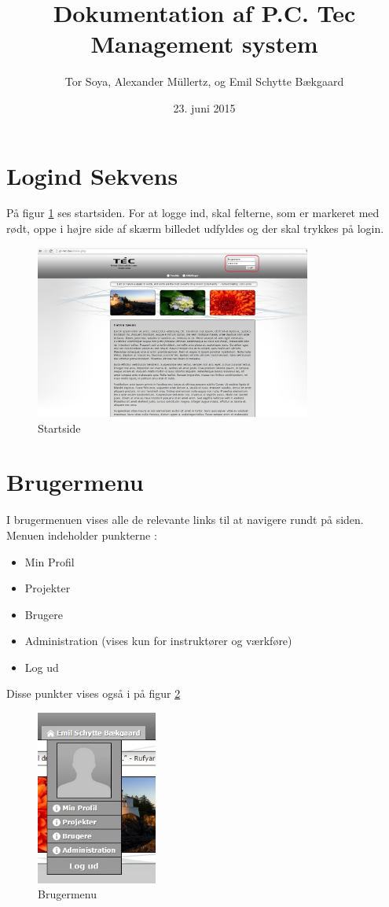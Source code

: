 \documentclass{article}
\begin{document}
\author{Tor Soya, Alexander Müllertz, og Emil Schytte Bækgaard}
\title{Dokumentation af P.C. Tec Management system}
\date{23. juni 2015}
\maketitle
\newpage
\tableofcontents
\newpage
\section{Logind Sekvens}


På figur \ref{fig:1} ses startsiden. For at logge ind, skal felterne, som er markeret med rødt, oppe i højre side af skærm billedet udfyldes og der skal trykkes på login.
\begin{figure}[ht]
\includegraphics[width=343px]{startside.jpg}
\caption{Startside}
\label{fig:1}
\end{figure}

\section{Brugermenu}
I brugermenuen vises alle de relevante links til at navigere rundt på siden.\\
Menuen indeholder punkterne :
\begin{itemize}
\item Min Profil
\item Projekter
\item Brugere
\item Administration (vises kun for instruktører og værkføre)
\item Log ud
\end{itemize}
Disse punkter vises også i på figur \ref{fig:2}

\begin{figure}[ht]
\includegraphics[width=150px]{brugermenu.jpg}
\caption{Brugermenu}
\label{fig:2}
\end{figure}
\end{document}
